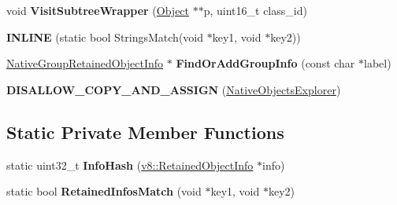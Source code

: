 \begin{DoxyCompactItemize}
\item 
void {\bfseries Visit\+Subtree\+Wrapper} (\hyperlink{classv8_1_1internal_1_1_object}{Object} $\ast$$\ast$p, uint16\+\_\+t class\+\_\+id)\hypertarget{classv8_1_1internal_1_1_native_objects_explorer_abbc26fb8db4f8a8f9584e09b294f8be0}{}\label{classv8_1_1internal_1_1_native_objects_explorer_abbc26fb8db4f8a8f9584e09b294f8be0}

\item 
{\bfseries I\+N\+L\+I\+NE} (static bool Strings\+Match(void $\ast$key1, void $\ast$key2))\hypertarget{classv8_1_1internal_1_1_native_objects_explorer_a80ba7968853fbc864650338b1c6455d2}{}\label{classv8_1_1internal_1_1_native_objects_explorer_a80ba7968853fbc864650338b1c6455d2}

\item 
\hyperlink{classv8_1_1internal_1_1_native_group_retained_object_info}{Native\+Group\+Retained\+Object\+Info} $\ast$ {\bfseries Find\+Or\+Add\+Group\+Info} (const char $\ast$label)\hypertarget{classv8_1_1internal_1_1_native_objects_explorer_aa060688fd614b7e5fd06282390f7abb8}{}\label{classv8_1_1internal_1_1_native_objects_explorer_aa060688fd614b7e5fd06282390f7abb8}

\item 
{\bfseries D\+I\+S\+A\+L\+L\+O\+W\+\_\+\+C\+O\+P\+Y\+\_\+\+A\+N\+D\+\_\+\+A\+S\+S\+I\+GN} (\hyperlink{classv8_1_1internal_1_1_native_objects_explorer}{Native\+Objects\+Explorer})\hypertarget{classv8_1_1internal_1_1_native_objects_explorer_ac00755de1fbac55446d7dfb884a4e3b6}{}\label{classv8_1_1internal_1_1_native_objects_explorer_ac00755de1fbac55446d7dfb884a4e3b6}

\end{DoxyCompactItemize}
\subsection*{Static Private Member Functions}
\begin{DoxyCompactItemize}
\item 
static uint32\+\_\+t {\bfseries Info\+Hash} (\hyperlink{classv8_1_1_retained_object_info}{v8\+::\+Retained\+Object\+Info} $\ast$info)\hypertarget{classv8_1_1internal_1_1_native_objects_explorer_a1d01b293e607f930c6c0a0586884b738}{}\label{classv8_1_1internal_1_1_native_objects_explorer_a1d01b293e607f930c6c0a0586884b738}

\item 
static bool {\bfseries Retained\+Infos\+Match} (void $\ast$key1, void $\ast$key2)\hypertarget{classv8_1_1internal_1_1_native_objects_explorer_a49e517831aa2bc2f16464fb4ec1bc9e9}{}\label{classv8_1_1internal_1_1_native_objects_explorer_a49e517831aa2bc2f16464fb4ec1bc9e9}

\end{DoxyCompactItemize}
